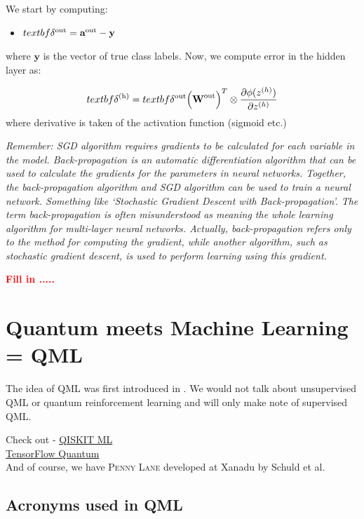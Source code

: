\documentclass[11pt]{article}
\newcommand{\TODO}[1]{\textcolor{red}{\textbf{#1}}}
\begin{document}
We start by computing:

\begin{itemize}
\item $textbf \delta^{\rm{out}}  = \textbf{a}^{\rm{out}} - \textbf{y}$
\end{itemize}
where $\textbf{y}$ is the vector of true class labels. Now, we compute error in the hidden layer as:


\begin{equation}
textbf{\delta}^{\rm{(h)}} = textbf{\delta}^{\rm{out}} \Big( \textbf{W}^{\rm{out}}\Big)^{T} \otimes \frac{\partial \phi(z^{(h)})}{\partial z^{(h)}}  
\end{equation}
where derivative is taken of the activation function (sigmoid etc.)  

\emph{Remember: SGD algorithm requires gradients to be calculated for 
each variable in the model. Back-propagation is an automatic differentiation 
algorithm that can be used to calculate the gradients for the parameters in neural networks.
Together, the back-propagation algorithm and SGD algorithm 
can be used to train a neural network. Something like
`Stochastic Gradient Descent with Back-propagation'. 
The term back-propagation is often misunderstood as meaning the whole learning algorithm 
for multi-layer neural networks. 
Actually, back-propagation refers only to the method for computing the gradient, 
while another algorithm, such as stochastic gradient descent, 
is used to perform learning using this gradient.} 


\TODO{Fill in .....} 




\section{Quantum meets Machine Learning = QML} 

The idea of QML was first introduced in \cite{2013arXiv1307.0411L}. 
We would not talk about unsupervised QML or quantum reinforcement learning and will only 
make note of supervised QML. 


Check out - \href{https://github.com/Qiskit/qiskit-machine-learning}{QISKIT ML}  \\ 
\href{https://github.com/tensorflow/quantum}{TensorFlow Quantum}  \cite{2020arXiv200302989B}  \\ 
And of course, we have \textsc{Penny Lane} developed at Xanadu by Schuld et al. 

\subsection{Acronyms used in QML} 
\end{document}
